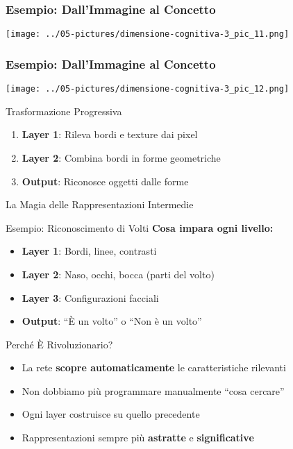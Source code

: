 \documentclass[aspectratio=169]{beamer}
\begin{document}
%
\begin{frame}
\frametitle{Esempio: Dall'Immagine al Concetto}
\begin{center}
\texttt{[image: ../05-pictures/dimensione-cognitiva-3\_pic\_11.png]} 
\end{center}
\end{frame}
%
%
\begin{frame}
\frametitle{Esempio: Dall'Immagine al Concetto}
\begin{center}
\texttt{[image: ../05-pictures/dimensione-cognitiva-3\_pic\_12.png]} 
\end{center}

\begin{block}{Trasformazione Progressiva}
\begin{enumerate}
\item \textbf{Layer 1}: Rileva bordi e texture dai pixel
\item \textbf{Layer 2}: Combina bordi in forme geometriche
\item \textbf{Output}: Riconosce oggetti dalle forme
\end{enumerate}
\end{block}

\end{frame}
%
%
\begin{frame}{La Magia delle Rappresentazioni Intermedie}

\begin{block}{Esempio: Riconoscimento di Volti}
\textbf{Cosa impara ogni livello:}
\begin{itemize}
\item \textbf{Layer 1}: Bordi, linee, contrasti
\item \textbf{Layer 2}: Naso, occhi, bocca (parti del volto)
\item \textbf{Layer 3}: Configurazioni facciali
\item \textbf{Output}: ``È un volto'' o ``Non è un volto''
\end{itemize}
\end{block}

\pause

\begin{block}{Perché È Rivoluzionario?}
\begin{itemize}
\item La rete \textbf{scopre automaticamente} le caratteristiche rilevanti
\item Non dobbiamo più programmare manualmente ``cosa cercare''
\item Ogni layer costruisce su quello precedente
\item Rappresentazioni sempre più \textbf{astratte} e \textbf{significative}
\end{itemize}
\end{block}

\end{frame}
\end{document}
